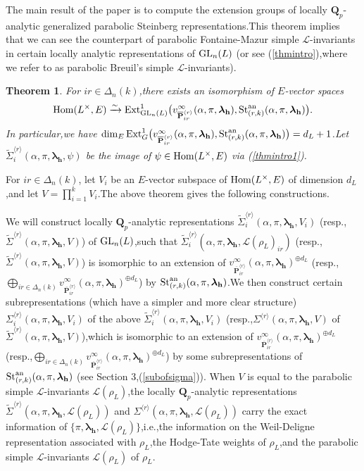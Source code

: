 \documentclass[SecEq,CM,GP]{degruyter-crelle} %
\theoremstyle{plain}
\newtheorem{thm}{Theorem}[section]
\newcommand{\ana}{{\rm an}}
\newcommand{\ext}{{\rm Ext}}
\newcommand{\GL}{{\rm GL}}
\newcommand{\homo}{{\rm Hom}}
\newcommand{\lrr}{{\langle r\rangle}}
\newcommand{\op}{{\overline{{\mathbf{P}}}}}
\newcommand{\st}{{\rm St}}
\newcommand{\bQ}{{\mathbf{Q}}}
\newcommand{\bh}{{\mathbf{h}}}
\newcommand{\sL}{\mathcal L}
\begin{document}
The main result  of the paper \cite[Theorem 5.19]{2022ext1hyq} is to compute the extension groups of locally $\bQ_p$-analytic generalized parabolic Steinberg representations.\;This theorem implies that we can see the counterpart of parabolic Fontaine-Mazur simple $\sL$-invariants in certain locally analytic representations of $\GL_n(L)$ (or see (\ref{thmintro}),\;where we refer to as parabolic Breuil's  simple $\sL$-invariants).\;
\begin{thm}
	For $ir\in {\Delta_n(k)}$,\;there exists an isomorphism of $E$-vector spaces 
	\begin{equation}\label{thmintro1}
		\homo(L^\times,E)\xrightarrow{\sim }\ext^1_{\GL_n(L)}\big(v_{\op^{\lrr}_{ir}}^{\infty}(\alpha,\pi,{\bm\lambda}_\bh), \st_{(r,k)}^{\ana}(\alpha,\pi,{\bm\lambda}_\bh)\big).
	\end{equation}
	In particular,\;we have $\dim_E  \ext^1_{G}\big(v_{\op^{\lrr}_{ir}}^{\infty}(\alpha,\pi,{\bm\lambda}_\bh), \st_{(r,k)}^{\ana}(\alpha,\pi,{\bm\lambda}_\bh)\big)=d_L+1$.\;Let $\widetilde{\Sigma}_i^{\lrr}(\alpha,\pi,{\bm\lambda}_\bh, \psi)$ be the image of $\psi\in \homo(L^\times,E)$ via (\ref{thmintro1}).\;
\end{thm}

For $ir\in \Delta_n(k)$, let $V_i$ be an $E$-vector subspace of $\homo(L^\times,E)$  of dimension $d_L$,\;and let $V=\prod_{i=1}^kV_i$.\;The above theorem gives the following constructions.\;

We will construct  locally $\bQ_p$-analytic representations  $\widetilde{\Sigma}_i^{\lrr}(\alpha,\pi,{\bm\lambda}_\bh, V_i)$ (resp.,\;$	\widetilde{\Sigma}^{\lrr}(\alpha,\pi,{\bm\lambda}_\bh, V)$) of $\GL_n(L)$,\;such that $\widetilde{\Sigma}_i^{\lrr}(\alpha,\pi,{\bm\lambda}_\bh, \sL(\rho_L)_{ir})$ (resp.,\;$\widetilde{\Sigma}^{\lrr}(\alpha,\pi,{\bm\lambda}_\bh, V)$) is isomorphic to an extension of $v_{\op^{\lrr}_{ir}}^{\infty}(\alpha,\pi,{\bm\lambda}_\bh)^{\oplus d_L}$ (resp.,\;$\bigoplus_{ir\in \Delta_n(k)}v_{\op^{\lrr}_{ir}}^{\infty}(\alpha,\pi,{\bm\lambda}_\bh)^{\oplus d_L}$) by $\st_{(r,k)}^{\ana}(\alpha,\pi,{\bm\lambda}_\bh)$.\;We then construct  certain subrepresentations (which have a simpler and more clear structure) $\Sigma_i^{\lrr}(\alpha,\pi,{\bm\lambda}_\bh, V_i)$ of the above $\widetilde{\Sigma}_i^{\lrr}(\alpha,\pi,{\bm\lambda}_\bh, V_i)$ (resp.,\;$\Sigma^{\lrr}(\alpha,\pi,{\bm\lambda}_\bh, V)$ of $\widetilde{\Sigma}^{\lrr}(\alpha,\pi,{\bm\lambda}_\bh, V)$),\;which is isomorphic to an  extension of $v_{\op^{\lrr}_{ir}}^{\infty}(\alpha,\pi,{\bm\lambda}_\bh)^{\oplus d_L}$ (resp.,\;$\bigoplus_{ir\in \Delta_n(k)}v_{\op^{\lrr}_{ir}}^{\infty}(\alpha,\pi,{\bm\lambda}_\bh)^{\oplus d_L}$) by some subrepresentations of $\st_{(r,k)}^{\ana}(\alpha,\pi,{\bm\lambda}_\bh)$ (see Section 3,\;(\ref{subofsigma})). When $V$ is equal to the parabolic simple $\sL$-invariants $\sL(\rho_L)$,\;the locally $\bQ_p$-analytic representations $\widetilde{\Sigma}^{\lrr}(\alpha,\pi,{\bm\lambda}_\bh, \sL(\rho_L))$ and $	\Sigma^{\lrr}(\alpha,\pi,{\bm\lambda}_\bh, \sL(\rho_L))$ carry the exact information of $\{\pi,{\bm\lambda}_\bh,\sL(\rho_L)\}$,\;i.e.,\;the information on the Weil-Deligne representation associated with $\rho_L$,\;the Hodge-Tate weights of $\rho_L$,\;and the parabolic simple $\sL$-invariants $\sL(\rho_L)$ of $\rho_L$.\;
\end{document}
